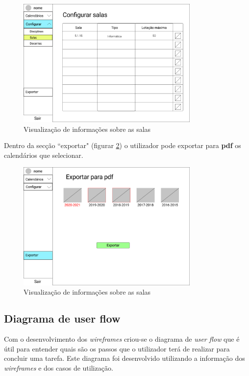 \documentclass[11pt, twoside]{report}
\begin{document}
	 
	\begin{figure}[H] 
		\centering 
		\includegraphics[width=0.8\textwidth,height=0.8\textheight,keepaspectratio]{image/prototipowireframes/configurarsalas}
		\caption{Visualização de informações sobre as salas}
		\label{configurarsalas}
	\end{figure}

Dentro da secção ``exportar"  (figurar \ref{exportar}) o utilizador pode exportar para \textbf{pdf} os calendários que selecionar.


	\begin{figure}[H] 
	\centering 
	\includegraphics[width=0.8\textwidth,height=0.8\textheight,keepaspectratio]{image/prototipowireframes/exportarpdf}
	\caption{Visualização de informações sobre as salas}
	\label{exportar}
\end{figure}

	
	\subsection{Diagrama de user flow}

	Com o desenvolvimento dos \textit{wireframes} criou-se o diagrama de \textit{user flow} que é útil para entender quais são os passos que o utilizador terá de realizar para concluir uma tarefa. Este diagrama foi desenvolvido utilizando a informação dos \textit{wireframes} e dos casos de utilização.
	
\end{document}
